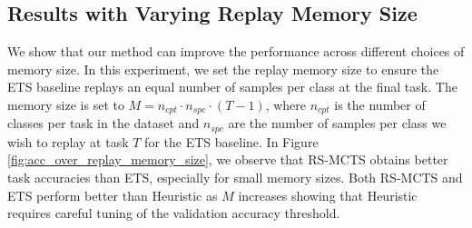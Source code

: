 


\subsection{Results with Varying Replay Memory Size}
\label{paperC:sec:results_with_varying_replay_memory_size}
We show that our method can improve the performance across different choices of memory size.
In this experiment, we set the replay memory size to ensure the ETS baseline replays an equal number of samples per class at the final task. 
The memory size is set to $M = n_{cpt} \cdot n_{spc} \cdot (T-1)$, where $n_{cpt}$ is the number of classes per task in the dataset and $n_{spc}$ are the number of samples per class we wish to replay at task $T$ for the ETS baseline. 
In Figure \ref{fig:acc_over_replay_memory_size}, we observe that RS-MCTS obtains better task accuracies than ETS, especially for small memory sizes. Both RS-MCTS and ETS perform better than Heuristic as $M$ increases showing that Heuristic requires careful tuning of the validation accuracy threshold. 




